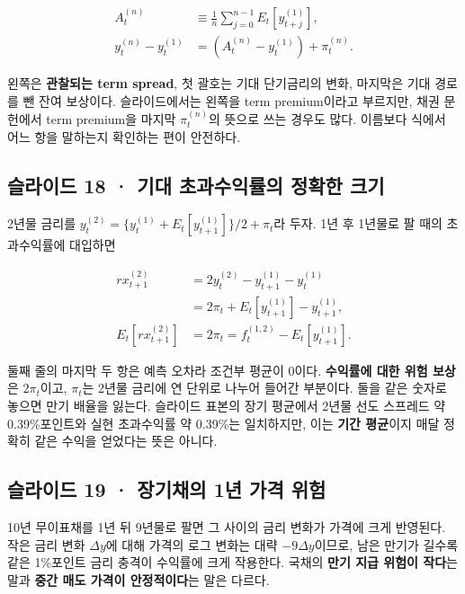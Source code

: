 \documentclass[11pt,a4paper]{article}
\begin{document}
\[
\begin{aligned}
A_t^{(n)}&\equiv\frac1n\sum_{j=0}^{n-1}E_t[y_{t+j}^{(1)}],\\
y_t^{(n)}-y_t^{(1)}&=(A_t^{(n)}-y_t^{(1)})+\pi_t^{(n)}.
\end{aligned}
\]

왼쪽은 \textbf{관찰되는 term spread}, 첫 괄호는 기대 단기금리의 변화, 마지막은 기대 경로를 뺀 잔여 보상이다. 슬라이드에서는 왼쪽을 term premium이라고 부르지만, 채권 문헌에서 term premium을 마지막 $\pi_t^{(n)}$의 뜻으로 쓰는 경우도 많다. 이름보다 식에서 어느 항을 말하는지 확인하는 편이 안전하다.\par

\subsection{슬라이드 18 · 기대 초과수익률의 정확한 크기}
2년물 금리를 $y_t^{(2)}=\{y_t^{(1)}+E_t[y_{t+1}^{(1)}]\}/2+\pi_t$라 두자. 1년 후 1년물로 팔 때의 초과수익률에 대입하면\par

\[
\begin{aligned}
rx_{t+1}^{(2)}
&=2y_t^{(2)}-y_{t+1}^{(1)}-y_t^{(1)}\\
&=2\pi_t+E_t[y_{t+1}^{(1)}]-y_{t+1}^{(1)},\\
E_t[rx_{t+1}^{(2)}]&=2\pi_t=f_t^{(1,2)}-E_t[y_{t+1}^{(1)}].
\end{aligned}
\]

둘째 줄의 마지막 두 항은 예측 오차라 조건부 평균이 0이다. \textbf{수익률에 대한 위험 보상}은 $2\pi_t$이고, $\pi_t$는 2년물 금리에 연 단위로 나누어 들어간 부분이다. 둘을 같은 숫자로 놓으면 만기 배율을 잃는다. 슬라이드 표본의 장기 평균에서 2년물 선도 스프레드 약 0.39\%포인트와 실현 초과수익률 약 0.39\%는 일치하지만, 이는 \textbf{기간 평균}이지 매달 정확히 같은 수익을 얻었다는 뜻은 아니다.\par

\subsection{슬라이드 19 · 장기채의 1년 가격 위험}
10년 무이표채를 1년 뒤 9년물로 팔면 그 사이의 금리 변화가 가격에 크게 반영된다. 작은 금리 변화 $\Delta y$에 대해 가격의 로그 변화는 대략 $-9\Delta y$이므로, 남은 만기가 길수록 같은 1\%포인트 금리 충격이 수익률에 크게 작용한다. 국채의 \textbf{만기 지급 위험이 작다}는 말과 \textbf{중간 매도 가격이 안정적이다}는 말은 다르다.\par
\end{document}
